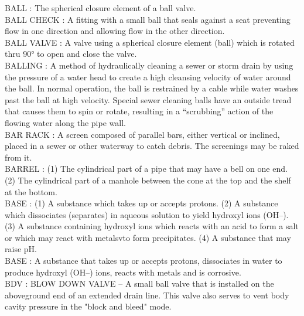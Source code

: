 \vspace{0.15cm}
BALL :   The spherical closure element of a ball valve.\\
\vspace{0.15cm}
BALL CHECK :   A fitting with a small ball that seals against a seat preventing flow in one direction and allowing flow in the other direction.\\
\vspace{0.15cm}
BALL VALVE :   A valve using a spherical closure element (ball) which is rotated thru 90° to open and close the valve.\\
\vspace{0.15cm}
BALLING :  A method of hydraulically cleaning a sewer or storm drain by using the pressure of a water head to create a high cleansing velocity of water around the ball. In normal operation, the ball is restrained by a cable while water washes past the ball at high velocity. Special sewer cleaning balls have an outside tread that causes them to spin or rotate, resulting in a “scrubbing” action of the flowing water along the pipe wall. \\
\vspace{0.15cm}
BAR RACK :  A screen composed of parallel bars, either vertical or inclined, placed in a sewer or other waterway to catch debris. The screenings may be raked from it. \\
\vspace{0.15cm}
BARREL :  (1) The cylindrical part of a pipe that may have a bell on one end. (2) The cylindrical part of a manhole between the cone at the top and the shelf at the bottom. \\
\vspace{0.15cm}
BASE :  (1)    A substance which takes up or accepts protons.  (2)    A substance which dissociates (separates) in aqueous solution to yield hydroxyl ions (OH–).  (3)    A substance containing hydroxyl ions which reacts with an acid to form a salt or which may react with metalsvto form precipitates.  (4)    A substance that may raise pH.\\
\vspace{0.15cm}
BASE :  A substance that takes up or accepts protons, dissociates in water to produce hydroxyl (OH–) ions, reacts with metals and is corrosive.\\
\vspace{0.15cm}
BDV :  BLOW DOWN VALVE –  A small ball valve that is installed on the aboveground end of an extended drain line. This valve also serves to vent body cavity pressure in the "block and bleed" mode.\\
